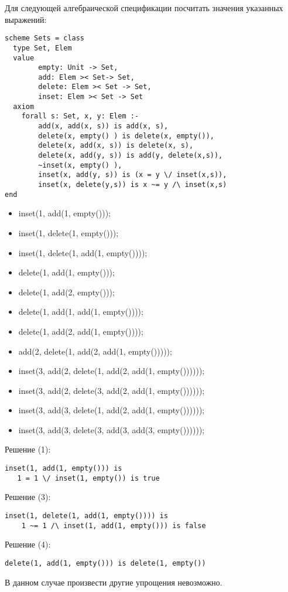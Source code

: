

\z Для следующей алгебраической спецификации посчитать значения указанных выражений:
\begin{lstlisting}
scheme Sets = class
  type Set, Elem
  value
        empty: Unit -> Set,
        add: Elem >< Set-> Set,
        delete: Elem >< Set -> Set,
        inset: Elem >< Set -> Set
  axiom
    forall s: Set, x, y: Elem :-
        add(x, add(x, s)) is add(x, s),
        delete(x, empty() ) is delete(x, empty()),
        delete(x, add(x, s)) is delete(x, s),
        delete(x, add(y, s)) is add(y, delete(x,s)),
        ~inset(x, empty() ),
        inset(x, add(y, s)) is (x = y \/ inset(x,s)),
        inset(x, delete(y,s)) is x ~= y /\ inset(x,s)
end
\end{lstlisting}
\begin{itemize}
  \item inset(1, add(1, empty()));
  \item inset(1, delete(1, empty()));
  \item inset(1, delete(1, add(1, empty())));
  \item delete(1, add(1, empty()));
  \item delete(1, add(2, empty()));
  \item delete(1, add(1, add(1, empty())));
  \item delete(1, add(2, add(1, empty())));
  \item add(2, delete(1, add(2, add(1, empty()))));
  \item inset(3, add(2, delete(1, add(2, add(1, empty())))));
  \item inset(3, add(2, delete(3, add(2, add(1, empty())))));
  \item inset(3, add(3, delete(1, add(2, add(1, empty())))));
  \item inset(3, add(3, delete(3, add(3, add(3, empty())))));
\end{itemize}

Решение (1):
\begin{lstlisting}
inset(1, add(1, empty())) is
   1 = 1 \/ inset(1, empty()) is true
\end{lstlisting}

Решение (3):
\begin{lstlisting}
inset(1, delete(1, add(1, empty()))) is
    1 ~= 1 /\ inset(1, add(1, empty())) is false
\end{lstlisting}

Решение (4):
\begin{lstlisting}
delete(1, add(1, empty())) is delete(1, empty())
\end{lstlisting}
В данном случае произвести другие упрощения невозможно.

